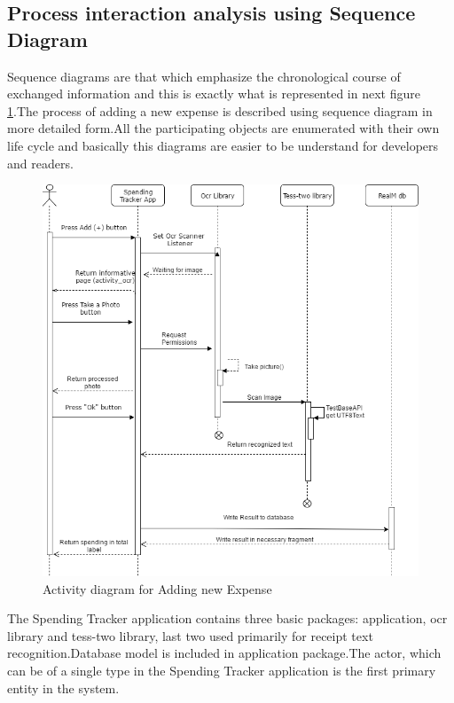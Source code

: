 \subsection{Process interaction analysis using Sequence Diagram}
Sequence diagrams are that which emphasize the chronological course of exchanged information and this is exactly what is represented in next figure \ref{fig:firstsequence}.The process of adding a new expense is described using sequence diagram in more detailed form.All the participating objects are enumerated with their own life cycle and basically this diagrams are easier to be understand for developers and readers.  
\begin{figure}[H]
	\centering
	\includegraphics[width=18cm]{Chapter2/sequencescanreceipt.png}
	\caption{Activity diagram for Adding new Expense}
	\label{fig:firstsequence}
\end{figure}
The Spending Tracker application contains three basic packages: application, ocr library and tess-two library, last two used primarily for receipt text recognition.Database model is included in application package.The actor, which can be of a single type in the Spending Tracker application is the first primary entity in the system.
